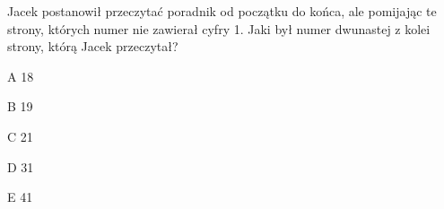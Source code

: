 \begin{tresc}
Jacek postanowił przeczytać poradnik od początku do końca, ale pomijając te strony, których numer nie zawierał cyfry 1. Jaki był numer dwunastej z kolei strony, którą Jacek przeczytał?
\end{tresc}
\begin{wariant}{A} 18 \end{wariant}
\begin{wariant}{B} 19 \end{wariant}
\begin{wariant}{C} 21 \end{wariant}
\begin{wariant}{D} 31 \end{wariant}
\begin{wariant}{E} 41 \end{wariant}
